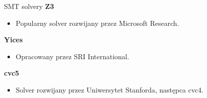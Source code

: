 \begin{frame}{SMT solvery}
		\textbf{Z3}
		\begin{itemize}
			\item Popularny solver rozwijany przez Microsoft Research.
		\end{itemize}
	\vspace{15pt}
	
		\textbf{Yices}
		\begin{itemize}
			\item Opracowany przez SRI International.
		\end{itemize}
	\vspace{15pt}
	
		\textbf{cvc5}
		\begin{itemize}
			\item Solver rozwijany przez Uniwersytet Stanforda, następca cvc4.
		\end{itemize}	

\end{frame}